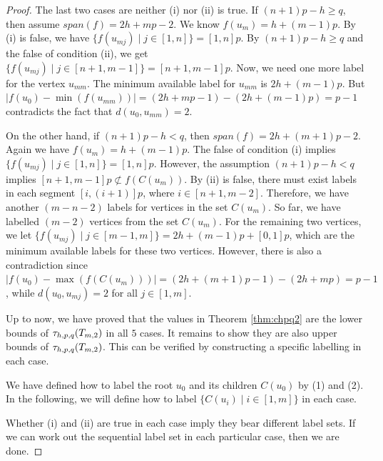 \begin{proof}
The last two cases are neither (i) nor (ii) is true. If $(n+1)p-h \ge q$, then assume $span(f) = 2h+mp-2$. We know $f(u_m) = h+(m-1)p$. By (i) is false, we have $\{f(u_{mj}) \mid j \in [1,n]\} = [1,n]p$. By $(n+1)p-h \ge q$ and the false of condition (ii), we get $\{f(u_{mj}) \mid j \in [n+1, m-1]\}=[n+1, m-1]p$. Now, we need one more label for the vertex $u_{mm}$. The minimum available label for $u_{mm}$ is $2h+(m-1)p$. But $|f(u_0) - \min(f(u_{mm}))| = (2h+mp-1)-(2h+(m-1)p) = p-1$ contradicts the fact that $d(u_0, u_{mm}) = 2$. 

On the other hand, if $(n+1)p-h < q$, then $span(f)= 2h+(m+1)p-2$. Again we have $f(u_m) = h+(m-1)p$. The false of condition (i) implies $\{f(u_{mj}) \mid j \in [1,n]\}=[1,n]p$. However, the assumption $(n+1)p-h < q$ implies $[n+1, m-1]p \not\subset f(C(u_m))$. By (ii) is false, there must exist labels in each segment $[i, (i+1)]p$, where $i \in [n+1, m-2]$. Therefore, we have another $(m-n-2)$ labels for vertices in the set $C(u_m)$. So far, we have labelled $(m-2)$ vertices from the set $C(u_m)$. For the remaining two vertices, we let $\{f(u_{mj}) \mid j \in [m-1,m]\} = 2h+(m-1)p+[0,1]p$, which are the minimum available labels for these two vertices. However, there is also a contradiction since $|f(u_0) - \max(f(C(u_m)))| = (2h+(m+1)p-1) - (2h+mp) = p-1$, while $d(u_0, u_{mj}) = 2$ for all $j \in [1,m]$. 

Up to now, we have proved that the values in Theorem \ref{thm:chpq2} are the lower bounds of $\thpq(\tm2)$ in all $5$ cases. It remains to show they are also upper bounds of $\thpq(\tm2)$. This can be verified by constructing a specific labelling in each case. 

We have defined how to label the root $u_0$ and its children $C(u_0)$ by (1) and (2). In the following, we will define how to label $\{C(u_i) \mid i \in [1,m]\}$ in each case.

Whether (i) and (ii) are true in each case imply they bear different label sets. If we can work out the sequential label set in each particular case, then we are done. 


\end{proof}
